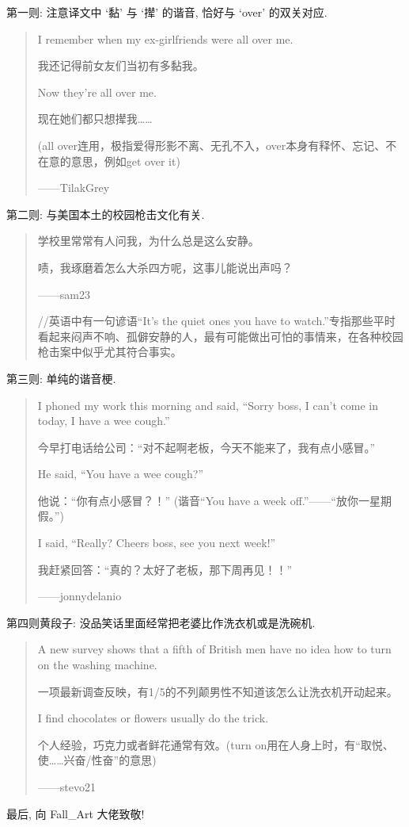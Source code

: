 \documentclass[a4paper, 12pt, UTF8]{article}
\begin{document}
第一则: 注意译文中 `黏' 与 `撵' 的谐音, 恰好与 `over' 的双关对应.

\begin{quote}
    I remember when my ex-girlfriends were all over me.
    
    我还记得前女友们当初有多黏我。
    
    Now they’re all over me.
    
    现在她们都只想撵我……
    
    (all over连用，极指爱得形影不离、无孔不入，over本身有释怀、忘记、不在意的意思，例如get over it)
    
    ——TilakGrey
\end{quote}

第二则: 与美国本土的校园枪击文化有关.

\begin{quote}
    学校里常常有人问我，为什么总是这么安静。
    
    啧，我琢磨着怎么大杀四方呢，这事儿能说出声吗？
    
    ——sam23
    
    //英语中有一句谚语“It’s the quiet ones you have to watch.”专指那些平时看起来闷声不响、孤僻安静的人，最有可能做出可怕的事情来，在各种校园枪击案中似乎尤其符合事实。
\end{quote}

第三则: 单纯的谐音梗.

\begin{quote}
    I phoned my work this morning and said, “Sorry boss, I can’t come in today, I have a wee cough.”
    
    今早打电话给公司：“对不起啊老板，今天不能来了，我有点小感冒。”
    
    He said, “You have a wee cough?”
    
    他说：“你有点小感冒？！” (谐音“You have a week off.”——“放你一星期假。”)
    
    I said, “Really? Cheers boss, see you next week!”
    
    我赶紧回答：“真的？太好了老板，那下周再见！！”
    
    ——jonnydelanio

\end{quote}

第四则黄段子: 没品笑话里面经常把老婆比作洗衣机或是洗碗机.

\begin{quote}
    A new survey shows that a fifth of British men have no idea how to turn on the washing machine.
    
    一项最新调查反映，有1/5的不列颠男性不知道该怎么让洗衣机开动起来。
    
    I find chocolates or flowers usually do the trick.
    
    个人经验，巧克力或者鲜花通常有效。(turn on用在人身上时，有“取悦、使……兴奋/性奋”的意思)
    
    ——stevo21
    
\end{quote}

最后, 向 Fall\_Art 大佬致敬!
\end{document}
